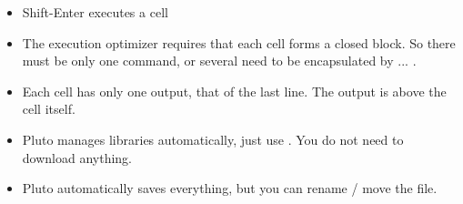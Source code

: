 \begin{itemize}
\item Shift-Enter executes a cell

\item The execution optimizer requires that each cell forms a closed block. So there must be only one command, or several need to be encapsulated by   ... .

\item Each cell has only one output, that of the last line. The output is above the cell itself.

\item Pluto manages libraries automatically, just use . You do not need to download anything.

\item Pluto automatically saves everything, but you can rename / move the file.



\end{itemize}




